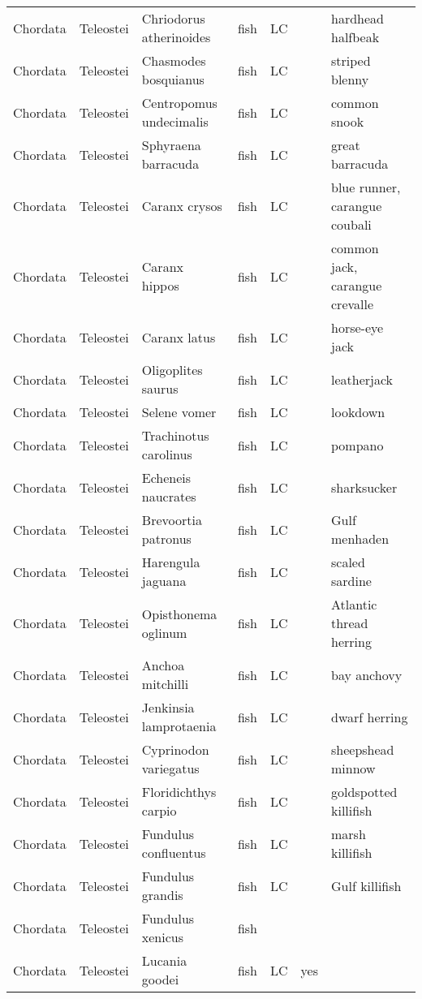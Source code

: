 \begin{longtable}{lllllll}
  Chordata & Teleostei & Chriodorus atherinoides & fish & LC &  & hardhead halfbeak \\ 
  Chordata & Teleostei & Chasmodes bosquianus & fish & LC &  & striped blenny \\ 
  Chordata & Teleostei & Centropomus undecimalis & fish & LC &  & common snook \\ 
  Chordata & Teleostei & Sphyraena barracuda & fish & LC &  & great barracuda \\ 
  Chordata & Teleostei & Caranx crysos & fish & LC &  & blue runner, carangue coubali \\ 
  Chordata & Teleostei & Caranx hippos & fish & LC &  & common jack, carangue crevalle \\ 
  Chordata & Teleostei & Caranx latus & fish & LC &  & horse-eye jack \\ 
  Chordata & Teleostei & Oligoplites saurus & fish & LC &  & leatherjack \\ 
  Chordata & Teleostei & Selene vomer & fish & LC &  & lookdown \\ 
  Chordata & Teleostei & Trachinotus carolinus & fish & LC &  & pompano \\ 
  Chordata & Teleostei & Echeneis naucrates & fish & LC &  & sharksucker \\ 
  Chordata & Teleostei & Brevoortia patronus & fish & LC &  & Gulf menhaden \\ 
  Chordata & Teleostei & Harengula jaguana & fish & LC &  & scaled sardine \\ 
  Chordata & Teleostei & Opisthonema oglinum & fish & LC &  & Atlantic thread herring \\ 
  Chordata & Teleostei & Anchoa mitchilli & fish & LC &  & bay anchovy \\ 
  Chordata & Teleostei & Jenkinsia lamprotaenia & fish & LC &  & dwarf herring \\ 
  Chordata & Teleostei & Cyprinodon variegatus & fish & LC &  & sheepshead minnow \\ 
  Chordata & Teleostei & Floridichthys carpio & fish & LC &  & goldspotted killifish \\ 
  Chordata & Teleostei & Fundulus confluentus & fish & LC &  & marsh killifish \\ 
  Chordata & Teleostei & Fundulus grandis & fish & LC &  & Gulf killifish \\ 
  Chordata & Teleostei & Fundulus xenicus & fish &  &  &  \\ 
  Chordata & Teleostei & Lucania goodei & fish & LC & yes &  \\ 

\end{longtable}
